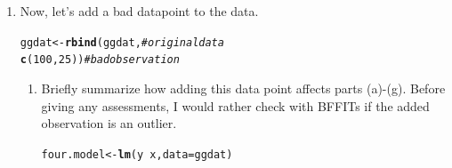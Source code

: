 \documentclass{article}\usepackage[]{graphicx}\usepackage[]{color}
\makeatletter
\newcommand{\hlnum}[1]{\textcolor[rgb]{0.686,0.059,0.569}{#1}}%
\newcommand{\hlcom}[1]{\textcolor[rgb]{0.678,0.584,0.686}{\textit{#1}}}%
\newcommand{\hlopt}[1]{\textcolor[rgb]{0,0,0}{#1}}%
\newcommand{\hlstd}[1]{\textcolor[rgb]{0.345,0.345,0.345}{#1}}%
\newcommand{\hlkwb}[1]{\textcolor[rgb]{0.69,0.353,0.396}{#1}}%
\newcommand{\hlkwc}[1]{\textcolor[rgb]{0.333,0.667,0.333}{#1}}%
\newcommand{\hlkwd}[1]{\textcolor[rgb]{0.737,0.353,0.396}{\textbf{#1}}}%
\newenvironment{kframe}{%
 \def\at@end@of@kframe{}%
 \ifinner\ifhmode%
  \def\at@end@of@kframe{\end{minipage}}%
  \begin{minipage}{\columnwidth}%
 \fi\fi%
 \def\FrameCommand##1{\hskip\@totalleftmargin \hskip-\fboxsep
 \colorbox{shadecolor}{##1}\hskip-\fboxsep
     \hskip-\linewidth \hskip-\@totalleftmargin \hskip\columnwidth}%
 \MakeFramed {\advance\hsize-\width
   \@totalleftmargin\z@ \linewidth\hsize
   \@setminipage}}%
 {\par\unskip\endMakeFramed%
 \at@end@of@kframe}
\newenvironment{knitrout}{}{} %
\makeatother
\begin{document}
\begin{enumerate}
\begin{enumerate}
    \item Now, let's add a bad datapoint to the data.
\begin{knitrout}
\color{fgcolor}\begin{kframe}
\begin{alltt}
\hlstd{ggdat} \hlkwb{<-} \hlkwd{rbind}\hlstd{(ggdat,}     \hlcom{# original data}
               \hlkwd{c}\hlstd{(}\hlnum{100}\hlstd{,}\hlnum{25}\hlstd{))} \hlcom{# bad observation}
\end{alltt}
\end{kframe}
\end{knitrout}
  \begin{enumerate}
    \item Briefly summarize how adding this data point affects parts (a)-(g).
    Before giving any assessments, I would rather check with BFFITs if the added observation is an outlier.
\begin{knitrout}
\color{fgcolor}\begin{kframe}
\begin{alltt}
\hlstd{four.model}\hlkwb{<-}\hlkwd{lm}\hlstd{(y}\hlopt{~}\hlstd{x,} \hlkwc{data}\hlstd{=ggdat)}
\end{alltt}
\end{kframe}
\end{knitrout}
  

\end{enumerate}
\end{enumerate}
\end{enumerate}
\end{document}

